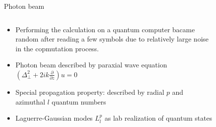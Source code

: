 \documentclass[aspectratio=169,9pt]{beamer}
\begin{document}
\begin{frame}[t]{Photon beam}
  \begin{columns}[T]
    \begin{column}[]{0.45\textwidth}
      \begin{itemize}
        \item Performing the calculation on a quantum computer bacame random after reading a few symbols due to relatively large noise in the copmutation process.
        \vspace*{1em}
        \item Photon beam described by paraxial wave equation $\left(\Delta_\perp^2+2ik\frac{\partial}{\partial z}\right)u=0$
        \item Special propagation property: described by radial $p$ and azimuthal $l$ quantum numbers
        \item Laguerre-Gaussian modes $L^p_l$ as lab realization of quantum states
      \end{itemize}
    \end{column}
    \begin{column}[]{0.05\textwidth}
    \end{column}
    \begin{column}[]{0.45\textwidth}
      \vspace*{-5em}
      \begin{figure}

\end{figure}
\end{column}
\end{columns}
\end{frame}
\end{document}
